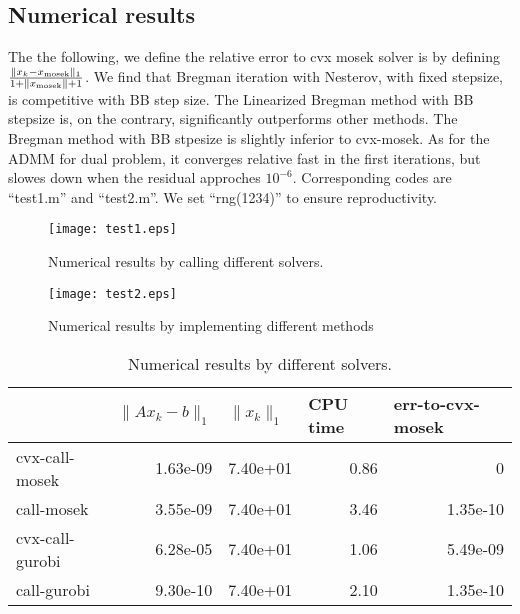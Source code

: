 \documentclass[conference,onecolumn,12pt]{IEEEtran}
\newcommand{\<}{\langle}
\renewcommand{\>}{\rangle}
\numberwithin{equation}{section}
\begin{document}
\subsection{Numerical results}
The the following, we define the relative error to cvx mosek solver is by defining $ \frac{\|x_k-x_{\rm mosek}\|_1}{1+\|x_{\rm mosek}\|+1}$. We find that Bregman iteration with Nesterov, with fixed stepsize, is competitive with BB step size. The Linearized Bregman method with BB stepsize is, on the contrary, significantly outperforms other methods. The Bregman method with BB stpesize is slightly inferior to cvx-mosek. As for the ADMM for dual problem, it converges relative fast in the first iterations, but slowes down when the residual approches $10^{-6}$. Corresponding codes are ``test1.m'' and ``test2.m''.
We set ``rng(1234)'' to ensure reproductivity.
\begin{figure*}[!htbp]
    \centering
    \texttt{[image: test1.eps]}
    \caption{Numerical results by calling different solvers.}
    \label{fig:test1}
    \end{figure*}
\begin{figure*}[!htbp]
\centering
\texttt{[image: test2.eps]}
\caption{Numerical results by implementing different methods}
\label{fig:test1}
\end{figure*}

        \begin{table}[!htbp]
            \centering
            \begin{tabular}{lrrrr}
                \toprule
                & \multicolumn{1}{l}{$\|Ax_k-b\|_1$} & \multicolumn{1}{l}{$\|x_k\|_1$} & \multicolumn{1}{l}{CPU time} & \multicolumn{1}{l}{err-to-cvx-mosek} \\
                \midrule
            cvx-call-mosek & 1.63e-09 & 7.40e+01 & 0.86 & 0 \\
            call-mosek & 3.55e-09 & 7.40e+01 & 3.46 & 1.35e-10 \\
            cvx-call-gurobi & 6.28e-05 & 7.40e+01 & 1.06 & 5.49e-09 \\
            call-gurobi & 9.30e-10 & 7.40e+01 & 2.10 & 1.35e-10 \\
            \bottomrule
            \end{tabular}
            \caption{Numerical results by different solvers.}
        \end{table}
\end{document}
